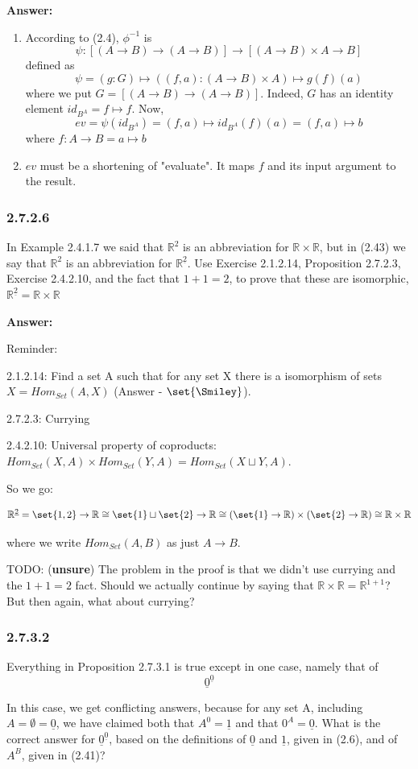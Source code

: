 \documentclass{article}
\newcommand{\Rational}{\mathbb{R}}
\newcommand{\Rat}{\mathbb{R}}
\newcommand{\vsp}[0]{\vspace*{10pt}\par}
\newcommand{\exercise}[1]{\subsubsection*{#1}}
\newcommand{\ans}[0]{\vsp\textbf{Answer: }\vsp}
\newcommand{\unsure}[0]{TODO: (\textbf{unsure}) }
\newcommand{\ei}{\item}
\newcommand{\es}{\begin{enumerate}[label=(\alph*)]\ei}
\newcommand{\ee}{\end{enumerate}}
\begin{document}
\ans

\es According to (2.4),
$\phi^{-1}$ is
\[
\psi : [(A \to B) \to (A \to B)] \to [(A \to B) \times A \to B]
\]
defined as
\[
\psi = (g:G) \mapsto ((f, a): (A \to B)\times A) \mapsto g(f)(a)
\]
where we put $G = [(A \to B) \to (A \to B)]$. Indeed, $G$ has an identity
element $id_{B^A} = f \mapsto f$.
Now, \[ev = \psi(id_{B^A}) = (f,a) \mapsto id_{B^A}(f)(a) = (f,a) \mapsto b\]
where $f: A \to B = a \mapsto b$

\ei $ev$ must be a shortening of "evaluate". It maps $f$ and its input argument
    to the result.

\ee

\exercise{2.7.2.6}

In Example 2.4.1.7 we said that $\Rational^2$ is an abbreviation for $\Rational
\times \Rational$, but in (2.43) we say that $\Rational^2$ is an abbreviation
for $\Rational^{\underline{2}}$. Use Exercise 2.1.2.14, Proposition 2.7.2.3,
Exercise 2.4.2.10, and the fact that $1+1=2$, to prove that these are
isomorphic, $\Rational^{\underline{2}} = \Rational \times \Rational$

\ans

Reminder:

2.1.2.14: Find a set A such that for any set X there is a isomorphism of sets $X
= Hom_{Set}(A,X)$ (Answer - $\set{\Smiley}$).

2.7.2.3: Currying

2.4.2.10: Universal property of coproducts: $Hom_{Set}(X,A) \times
Hom_{Set}(Y,A) = Hom_{Set}(X \sqcup Y, A)$.


So we go:

\[
\Rat^{\underline 2} = \set{1,2} \to \Rat \cong \set{1} \sqcup \set{2} \to
\Rat \cong (\set{1} \to \Rat) \times (\set{2} \to \Rat) \cong \Rat \times \Rat
\]

where we write $Hom_{Set}(A,B)$ as just $A \to B$.

\unsure The problem in the proof is that we didn't use currying and the $1+1=2$
fact. Should we actually continue by saying that $\Rat \times \Rat =
\Rat^{1+1}$? But then again, what about currying?

\exercise{2.7.3.2}

Everything in Proposition 2.7.3.1 is true except in one case, namely
that of
\[
  \underline{0}^{\underline{0}}
\]

In this case, we get conflicting answers, because for any set A, including $A =
\emptyset = \underline{0}$, we have claimed both that $A^0 = \underline{1}$ and
that $0^A = \underline{0}$.  What is the correct answer for
$\underline{0}^{\underline{0}}$, based on the definitions of $\underline{0}$ and
$\underline{1}$, given in (2.6), and of $A^B$, given in (2.41)?
\end{document}
